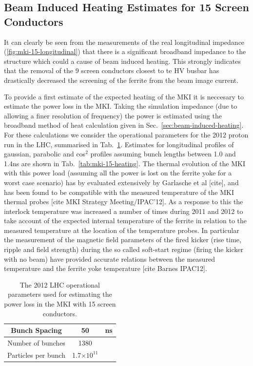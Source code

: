 \subsection{Beam Induced Heating Estimates for 15 Screen Conductors}

It can clearly be seen from the measurements of the real longitudinal impedance (\ref{fig:mki-15-longitudinal}) that there is a significant broadband impedance to the structure which could a cause of beam induced heating. This strongly indicates that the removal of the 9 screen conductors closest to te HV busbar has drastically decreased the screening of the ferrite from the beam image current.

To provide a first estimate of the expected heating of the MKI it is neccesary to estimate the power loss in the MKI. Taking the simulation impedance (due to allowing a finer resolution of frequency) the power is estimated using the broadband method of heat calculation given in Sec.~\ref{sec:beam-induced-heating}. For these calculations we consider the operational parameters for the 2012 proton run in the LHC, summarised in Tab.~\ref{tab:mki-beam-parameters}. Estimates for longitudinal profiles of gaussian, parabolic and cos$^{2}$ profiles assuming bunch lengths between 1.0 and 1.4ns are shown in Tab.~\ref{tab:mki-15-heating}. The thermal evolution of the MKI with this power load (assuming all the power is lost on the ferrite yoke for a worst case scenario) has by evaluated extensively by Garlasche et al [cite], and has been found to be compatible with the measured temperature of the MKI thermal probes [cite MKI Strategy Meeting/IPAC'12]. As a response to this the interlock temperature was increased a number of times during 2011 and 2012 to take account of the expected internal temperature of the ferrite in relation to the measured temperature at the location of the temperature probes. In particular the measurement of the magnetic field parameters of the fired kicker (rise time, ripple and field strength) during the so called soft-start regime (firing the kicker with no beam) have provided accurate relations between the measured temperature and the ferrite yoke temperature [cite Barnes IPAC12].

\begin{table}
\label{tab:mki-beam-parameters}
\caption{The 2012 LHC operational parameters used for estimating the power loss in the MKI with 15 screen conductors.}
\begin{center}
\begin{tabular}{c | c | c}
Bunch Spacing & 50 & ns \\ \hline
Number of bunches & 1380 & \\ \hline
Particles per bunch & 1.7$\times 10^{11}$ & \\
\end{tabular}
\end{center}
\end{table}

